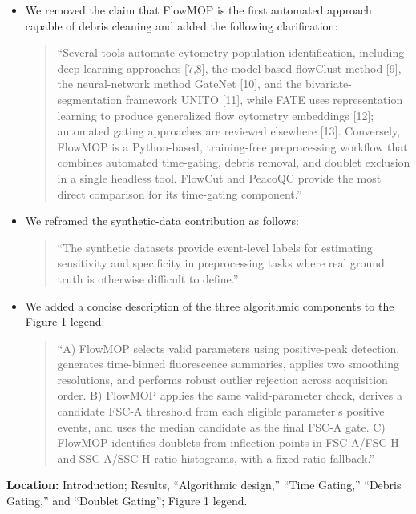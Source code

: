 \documentclass[
  11pt,
  a4paper,
]{article}
\begin{document}
\begin{itemize}
\item
  We removed the claim that FlowMOP is the first automated approach
  capable of debris cleaning and added the following clarification:

  \begin{quote}
  ``Several tools automate cytometry population identification,
  including deep-learning approaches {[}7,8{]}, the model-based
  flowClust method {[}9{]}, the neural-network method GateNet {[}10{]},
  and the bivariate-segmentation framework UNITO {[}11{]}, while FATE
  uses representation learning to produce generalized flow cytometry
  embeddings {[}12{]}; automated gating approaches are reviewed
  elsewhere {[}13{]}. Conversely, FlowMOP is a Python-based,
  training-free preprocessing workflow that combines automated
  time-gating, debris removal, and doublet exclusion in a single
  headless tool. FlowCut and PeacoQC provide the most direct comparison
  for its time-gating component.''
  \end{quote}
\item
  We reframed the synthetic-data contribution as follows:

  \begin{quote}
  ``The synthetic datasets provide event-level labels for estimating
  sensitivity and specificity in preprocessing tasks where real ground
  truth is otherwise difficult to define.''
  \end{quote}
\item
  We added a concise description of the three algorithmic components to
  the Figure 1 legend:

  \begin{quote}
  ``A) FlowMOP selects valid parameters using positive-peak detection,
  generates time-binned fluorescence summaries, applies two smoothing
  resolutions, and performs robust outlier rejection across acquisition
  order. B) FlowMOP applies the same valid-parameter check, derives a
  candidate FSC-A threshold from each eligible parameter's positive
  events, and uses the median candidate as the final FSC-A gate. C)
  FlowMOP identifies doublets from inflection points in FSC-A/FSC-H and
  SSC-A/SSC-H ratio histograms, with a fixed-ratio fallback.''
  \end{quote}
\end{itemize}

\textbf{Location:} Introduction; Results, ``Algorithmic design,'' ``Time
Gating,'' ``Debris Gating,'' and ``Doublet Gating''; Figure 1 legend.
\end{document}
